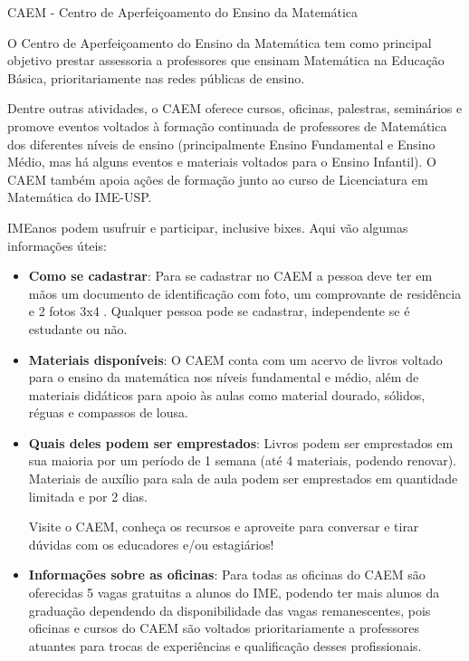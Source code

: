 \begin{secao}{CAEM - Centro de Aperfeiçoamento do Ensino da Matemática}

O Centro de Aperfeiçoamento do Ensino da Matemática tem como principal
objetivo prestar assessoria a professores que ensinam Matemática na
Educação Básica, prioritariamente nas redes públicas de ensino.

Dentre outras atividades, o CAEM oferece cursos, oficinas, palestras,
seminários e promove eventos voltados à formação continuada de
professores de Matemática dos diferentes níveis de ensino (principalmente
Ensino Fundamental e Ensino Médio, mas há alguns eventos e materiais
voltados para o Ensino Infantil). O CAEM também apoia ações de formação
junto ao curso de Licenciatura em Matemática do IME-USP.

IMEanos podem usufruir e participar, inclusive bixes. Aqui vão algumas
informações úteis:

\begin{itemize}

\item \textbf{Como se cadastrar}: Para se cadastrar no CAEM a pessoa
deve ter em mãos um documento de identificação com foto, um comprovante
de residência e 2 fotos 3x4 . Qualquer pessoa pode se cadastrar,
independente se é estudante ou não.

\item \textbf{Materiais disponíveis}: O CAEM conta com um acervo de
livros voltado para o ensino da matemática nos níveis fundamental e
médio, além de materiais didáticos para apoio às aulas como material
dourado, sólidos, réguas e compassos de lousa.

\item \textbf{Quais deles podem ser emprestados}: Livros podem ser
emprestados em sua maioria por um período de 1 semana (até 4 materiais,
podendo renovar). Materiais de auxílio para sala de aula podem ser
emprestados em quantidade limitada e por 2 dias.

  Visite o CAEM, conheça os recursos e aproveite para conversar e
  tirar dúvidas com os educadores e/ou estagiários!    

\item \textbf{Informações sobre as oficinas}: Para todas as oficinas do 
CAEM são oferecidas 5 vagas gratuitas a alunos do IME, podendo ter mais
alunos da graduação dependendo da disponibilidade das vagas remanescentes,
pois oficinas e cursos do CAEM são voltados prioritariamente a professores
atuantes para trocas de experiências e qualificação desses profissionais.


\end{itemize}
\end{secao}

